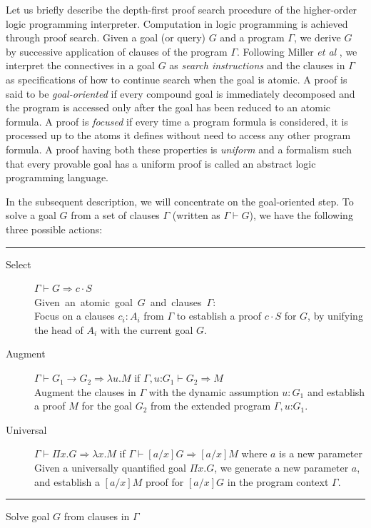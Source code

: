 \documentclass{acmconf}
\newcommand{\figfoot}{\vspace{1ex}\hrule}
\newcommand{\fighead}{\hrule\vspace{1.5ex}}
\newcommand{\vd}{\vdash}
\newcommand{\arrow}{\rightarrow}
\newcommand{\oftp}{\mathord{:}}
\begin{document}
Let us briefly describe the depth-first proof search procedure of the
higher-order logic programming interpreter. Computation in logic
programming is achieved through proof search. Given a goal (or query)
$G$ and a program $\Gamma$, we derive $G$ by successive application of
clauses of the program $\Gamma$. Following Miller {\em{et al}}
\cite{Miller91apal}, we interpret the connectives in a goal $G$ as
{\em{search instructions}} and the clauses in $\Gamma$ as
specifications of how to continue search when the goal is atomic. A
proof is said to be {\em{goal-oriented}} if every compound goal is
immediately decomposed and the program is accessed only after the goal
has been reduced to an atomic formula. A proof is {\em{focused}} if
every time a program formula is considered, it is processed up to the
atoms it defines without need to access any other program formula. A
proof having both these properties is {\em{uniform}} and a formalism
such that every provable goal has a uniform proof is called an
abstract logic programming language. 

In the subsequent description, we will concentrate on the
goal-oriented step. To solve a goal $G$ from a set of clauses $\Gamma$
(written as $\Gamma \vd G$), we have the following three possible
actions:   

\begin{table}[h]
\fighead
\begin{center}
\begin{small}
\begin{description}
\item[Select] $\Gamma \vd  G \Rightarrow c\cdot S$ \\
    \mbox{Given an atomic goal $G$ and clauses $\Gamma$:}\hfill\\
     Focus on a clauses $c_i : A_i$ from $\Gamma$ to establish a proof
     $c\cdot S$ for $G$, by unifying the head of $A_i$ with the current
     goal $G$. 

\item[Augment] $\Gamma \vd  G_1 \arrow G_2 \Rightarrow \lambda u. M$ if $\Gamma,
  u\oftp G_1 \vd G_2 \Rightarrow M$ \\
Augment the clauses in $\Gamma$ with the dynamic assumption $u : G_1$ and
establish a proof $M$ for the goal $G_2$ from the extended program
$\Gamma, u \oftp G_1$. 
\item[Universal] $\Gamma \vd  \Pi x. G \Rightarrow \lambda x. M$ if $\Gamma \vd
  [a/x]G\Rightarrow [a/x]M$ where $a$ is a new parameter\\
Given a universally quantified goal $\Pi x. G$, we generate a new parameter $a$, and establish a $[a/x]M$ proof  for $[a/x]G$ in the program context $\Gamma$.
\end{description}
\end{small}    
\end{center}
\figfoot
\caption{\label{fig:solve}Solve goal $G$ from clauses in $\Gamma$}
\end{table}
\end{document}
